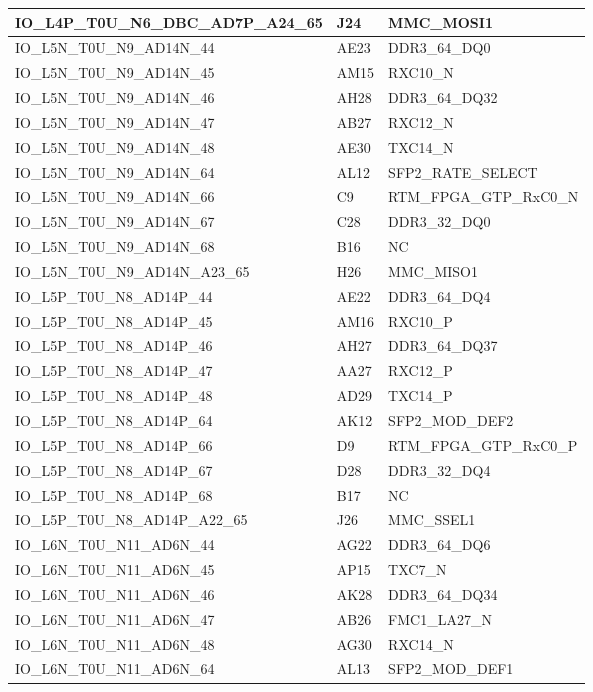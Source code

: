 \begin{footnotesize}
\begin{longtable}{|p{7cm}|p{1cm}|p{5cm}|}
IO\_L4P\_T0U\_N6\_DBC\_AD7P\_A24\_65	&	J24	&	MMC\_MOSI1	\\ \hline
IO\_L5N\_T0U\_N9\_AD14N\_44	&	AE23	&	DDR3\_64\_DQ0	\\ \hline
IO\_L5N\_T0U\_N9\_AD14N\_45	&	AM15	&	RXC10\_N	\\ \hline
IO\_L5N\_T0U\_N9\_AD14N\_46	&	AH28	&	DDR3\_64\_DQ32	\\ \hline
IO\_L5N\_T0U\_N9\_AD14N\_47	&	AB27	&	RXC12\_N	\\ \hline
IO\_L5N\_T0U\_N9\_AD14N\_48	&	AE30	&	TXC14\_N	\\ \hline
IO\_L5N\_T0U\_N9\_AD14N\_64	&	AL12	&	SFP2\_RATE\_SELECT	\\ \hline
IO\_L5N\_T0U\_N9\_AD14N\_66	&	C9	&	RTM\_FPGA\_GTP\_RxC0\_N	\\ \hline
IO\_L5N\_T0U\_N9\_AD14N\_67	&	C28	&	DDR3\_32\_DQ0	\\ \hline
IO\_L5N\_T0U\_N9\_AD14N\_68	&	B16	&	NC	\\ \hline
IO\_L5N\_T0U\_N9\_AD14N\_A23\_65	&	H26	&	MMC\_MISO1	\\ \hline
IO\_L5P\_T0U\_N8\_AD14P\_44	&	AE22	&	DDR3\_64\_DQ4	\\ \hline
IO\_L5P\_T0U\_N8\_AD14P\_45	&	AM16	&	RXC10\_P	\\ \hline
IO\_L5P\_T0U\_N8\_AD14P\_46	&	AH27	&	DDR3\_64\_DQ37	\\ \hline
IO\_L5P\_T0U\_N8\_AD14P\_47	&	AA27	&	RXC12\_P	\\ \hline
IO\_L5P\_T0U\_N8\_AD14P\_48	&	AD29	&	TXC14\_P	\\ \hline
IO\_L5P\_T0U\_N8\_AD14P\_64	&	AK12	&	SFP2\_MOD\_DEF2	\\ \hline
IO\_L5P\_T0U\_N8\_AD14P\_66	&	D9	&	RTM\_FPGA\_GTP\_RxC0\_P	\\ \hline
IO\_L5P\_T0U\_N8\_AD14P\_67	&	D28	&	DDR3\_32\_DQ4	\\ \hline
IO\_L5P\_T0U\_N8\_AD14P\_68	&	B17	&	NC	\\ \hline
IO\_L5P\_T0U\_N8\_AD14P\_A22\_65	&	J26	&	MMC\_SSEL1	\\ \hline
IO\_L6N\_T0U\_N11\_AD6N\_44	&	AG22	&	DDR3\_64\_DQ6	\\ \hline
IO\_L6N\_T0U\_N11\_AD6N\_45	&	AP15	&	TXC7\_N	\\ \hline
IO\_L6N\_T0U\_N11\_AD6N\_46	&	AK28	&	DDR3\_64\_DQ34	\\ \hline
IO\_L6N\_T0U\_N11\_AD6N\_47	&	AB26	&	FMC1\_LA27\_N	\\ \hline
IO\_L6N\_T0U\_N11\_AD6N\_48	&	AG30	&	RXC14\_N	\\ \hline
IO\_L6N\_T0U\_N11\_AD6N\_64	&	AL13	&	SFP2\_MOD\_DEF1	\\ \hline

\end{longtable}
\end{footnotesize}
